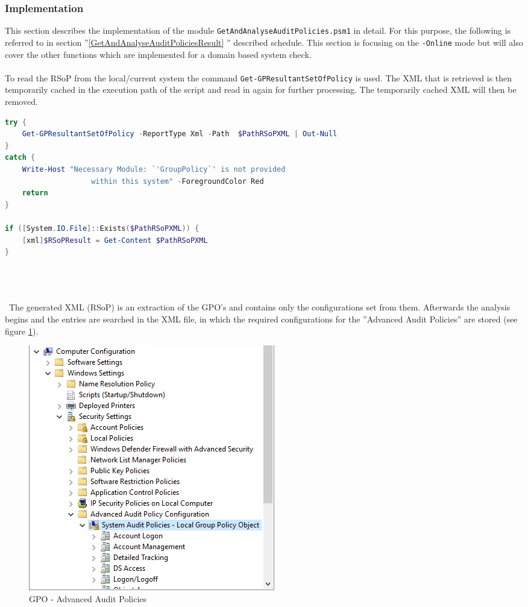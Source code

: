 \subsubsection{Implementation}
This section describes the implementation of the module \lstinline|GetAndAnalyseAuditPolicies.psm1| in detail. For this purpose, the following is referred to in section ''\ref{GetAndAnalyseAuditPoliciesResult} '' described schedule. This section is focusing on the \lstinline|-Online| mode but will also cover the other functions which are implemented for a domain based system check.
\\\\
To read the RSoP from the local/current system the command \lstinline|Get-GPResultantSetOfPolicy| is used. The XML that is retrieved is then temporarily cached in the execution path of the script and read in again for further processing. The temporarily cached XML will then be removed.
\begin{lstlisting}[caption=Get-GPResultantSetOfPolicy, language=PowerShell]
try {
    Get-GPResultantSetOfPolicy -ReportType Xml -Path  $PathRSoPXML | Out-Null
}
catch {
    Write-Host "Necessary Module: `'GroupPolicy`' is not provided 
                    within this system" -ForegroundColor Red
    return
}

if ([System.IO.File]::Exists($PathRSoPXML)) {
    [xml]$RSoPResult = Get-Content $PathRSoPXML
}
\end{lstlisting}
\vspace{0.5cm}
\begin{multicols}{2}
    \ \\\\\\ \
    The generated XML (RSoP) is an extraction of the GPO's and contains only the configurations set from them.
    Afterwards the analysis begins and the entries are searched in the XML file, in which the required configurations for the ''Advanced Audit Policies'' are stored (see figure \ref{fig:AdvancedAuditPolicies}).
    \begin{figure}[H]
        \centering
        \includegraphics[width=0.7\linewidth]{assets/GetAndCheckAuditPolicies/advancedauditpolicies.png}
        \caption{GPO - Advanced Audit Policies}\label{fig:AdvancedAuditPolicies}
    \end{figure}
\end{multicols}
